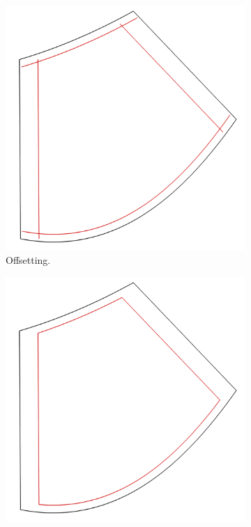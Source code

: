 \documentclass[a4paper, 11pt]{report}
\theoremstyle{definition}
\begin{document}
	\begin{figure}[H]
		\begin{subfigure}{.32\textwidth}
			\includegraphics[width=\textwidth]{../tec/chambers/11.png}
			\caption{Offsetting.}
		\end{subfigure}
		\begin{subfigure}{.32\textwidth}
			\includegraphics[width=\textwidth]{../tec/chambers/12.png}

\end{subfigure}
\end{figure}
\end{document}
